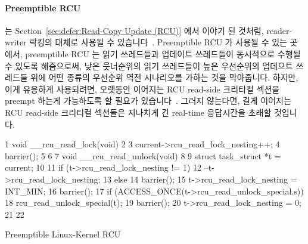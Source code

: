 \paragraph{Preemptible RCU}
는
Section~\ref{sec:defer:Read-Copy Update (RCU)} 에서 이야기 된 것처럼,
reader-writer 락킹의 대체로 사용될 수 있습니다~\cite{PaulEMcKenney2007WhatIsRCUFundamentally,PaulMcKenney2012RCUUsage,PaulEMcKenney2014RCUAPI}.
Preemptible RCU 가 사용될 수 있는 곳에서, preemptible RCU 는 읽기 쓰레드들과
업데이트 쓰레드들이 동시적으로 수행될 수 있도록 해줌으로써, 낮은 웃너순위의
읽기 쓰레드들이 높은 우선순위의 업데으트 쓰레드들 위에 어떤 종류의 우선순위
역전 시나리오를 가하는 것을 막아줍니다.
하지만, 이게 유용하게 사용되려면, 오랫동안 이어지는 RCU read-side 크리티컬
섹션을 preempt 하는게 가능하도록 할 필요가
있습니다~\cite{DinakarGuniguntala2008IBMSysJ}.
그러지 않는다면, 길게 이어지는 RCU read-side 크리티컬 섹션들은 지나치게 긴
real-time 응답시간을 초래할 것입니다.

\begin{listing}[tb]
{ \scriptsize
\begin{verbbox}
 1 void __rcu_read_lock(void)
 2 {
 3   current->rcu_read_lock_nesting++;
 4   barrier();
 5 }
 6 
 7 void __rcu_read_unlock(void)
 8 {
 9   struct task_struct *t = current;
10 
11   if (t->rcu_read_lock_nesting != 1) {
12     --t->rcu_read_lock_nesting;
13   } else {
14     barrier();
15     t->rcu_read_lock_nesting = INT_MIN;
16     barrier();
17     if (ACCESS_ONCE(t->rcu_read_unlock_special.s))
18       rcu_read_unlock_special(t);
19     barrier();
20     t->rcu_read_lock_nesting = 0;
21   }
22 }
\end{verbbox}
}
\centering
\theverbbox
\caption{Preemptible Linux-Kernel RCU}
\label{lst:advsync:Preemptible Linux-Kernel RCU}
\end{listing}

